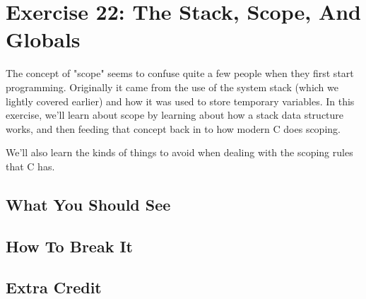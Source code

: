 \chapter{Exercise 22: The Stack, Scope, And Globals}

The concept of "scope" seems to confuse quite a few people when they first
start programming.  Originally it came from the use of the system stack
(which we lightly covered earlier) and how it was used to store temporary
variables.  In this exercise, we'll learn about scope by learning about
how a stack data structure works, and then feeding that concept back in
to how modern C does scoping.

We'll also learn the kinds of things to avoid when dealing with the
scoping rules that C has.


\section{What You Should See}


\section{How To Break It}


\section{Extra Credit}

